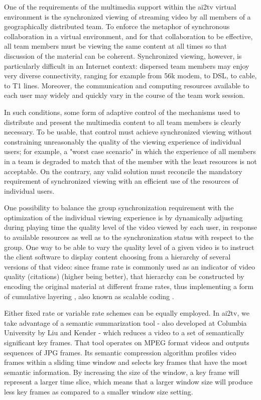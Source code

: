 \documentclass{sig-alternate}
\begin{document}
One of the requirements of the multimedia support within the ai2tv
virtual environment is the synchronized viewing of streaming video by
all members of a geographically distributed team. To enforce the
metaphor of synchronous collaboration in a virtual environment, and
for that collaboration to be effective, all team members must be
viewing the same content at all times so that discussion of the
material can be coherent.  Synchronized viewing, however, is
particularly difficult in an Internet context: dispersed team members
may enjoy very diverse connectivity, ranging for example from 56k
modem, to DSL, to cable, to T1 lines.  Moreover, the communication and
computing resources available to each user may widely and quickly vary
in the course of the team work session.

In such conditions, some form of adaptive control of the mechanisms
used to distribute and present the multimedia content to all team
members is clearly necessary.  To be usable, that control must achieve
synchronized viewing without constraining unreasonably the quality of
the viewing experience of individual users; for example, a "worst case
scenario" in which the experience of all members in a team is degraded
to match that of the member with the least resources is not
acceptable. On the contrary, any valid solution must reconcile the
mandatory requirement of synchronized viewing with an efficient use of
the resources of individual users.

One possibility to balance the group synchronization requirement with
the optimization of the individual viewing experience is by
dynamically adjusting during playing time the quality level of the
video viewed by each user, in response to available resources as well
as to the synchronization status with respect to the group.  One way
to be able to vary the quality level of a given video is to instruct
the client software to display content choosing from a hierarchy of
several versions of that video: since frame rate is commonly used as
an indicator of video quality (citations) (higher being better), that
hierarchy can be constructed by encoding the original material at
different frame rates, thus implementing a form of cumulative layering
\cite{MCCANNE}, also known as scalable coding \cite{LI}.

Either fixed rate or variable rate schemes can be equally employed. In
ai2tv, we take advantage of a semantic summarization tool - also
developed at Columbia University by Liu and Kender \cite{TIECHENG} -
which reduces a video to a set of semantically significant key frames.
That tool operates on MPEG format videos and outputs sequences of JPG
frames.  Its semantic compression algorithm profiles video frames
within a sliding time window and selects key frames that have the most
semantic information.  By increasing the size of the window, a key
frame will represent a larger time slice, which means that a larger
window size will produce less key frames as compared to a smaller
window size setting.
\end{document}
